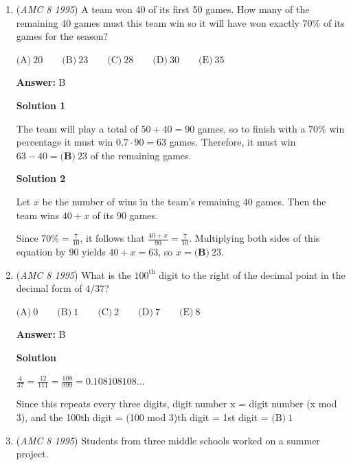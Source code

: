 \begin{enumerate}
 So $\angle AED=\angle AEB +\angle BED=40 +45=85^\circ$ Since ACDE is a quadrilateral, the sum of its angles is 360. Therefore: 
 \[\angle A +\angle C +\angle CDE +\angle AED=360\] 
 \[90 +90 +\angle CDE +85=360\] 
 \[\angle CDE=95^\circ \text{(E)}\]



	\item (\textit{AMC 8 1995}) A team won 40 of its first 50 games.  How many of the remaining 40 games must this team win so it will have won exactly 70\% of its games for the season?


 $\text{(A)}\ 20 \qquad \text{(B)}\ 23 \qquad \text{(C)}\ 28 \qquad \text{(D)}\ 30 \qquad \text{(E)}\ 35$

 \textbf{Answer: }B



\textbf{Solution 1}

The team will play a total of $50+40=90$ games, so to finish with a $70\%$ win percentage it must win $0.7 \cdot 90=63$ games. Therefore, it must win $63-40=\boxed{\textbf{(B)}\ 23}$ of the remaining games.

 



\textbf{Solution 2}

Let $x$ be the number of wins in the team's remaining $40$ games.  Then the team wins $40+x$ of its $90$ games.

 Since $70\% = \frac{7}{10}$, it follows that $\frac{40+x}{90}=\frac{7}{10}$.  Multiplying both sides of this equation by $90$ yields $40 + x = 63$, so $x=\boxed{\textbf{(B)}\ 23}$.

 


	\item (\textit{AMC 8 1995}) What is the $100^\text{th}$ digit to the right of the decimal point in the decimal form of $4/37$?


 $\text{(A)}\ 0 \qquad \text{(B)}\ 1 \qquad \text{(C)}\ 2 \qquad \text{(D)}\ 7 \qquad \text{(E)}\ 8$

 \textbf{Answer: }B



\textbf{Solution}

$\frac{4}{37}=\frac{12}{111}=\frac{108}{999}=0.108108108...$

 Since this repeats every three digits, digit number x = digit number (x mod 3), and the 100th digit = (100 mod 3)th digit = 1st digit = $\boxed{\text{(B)}\ 1}$



	\item (\textit{AMC 8 1995}) Students from three middle schools worked on a summer project.



\end{enumerate}
